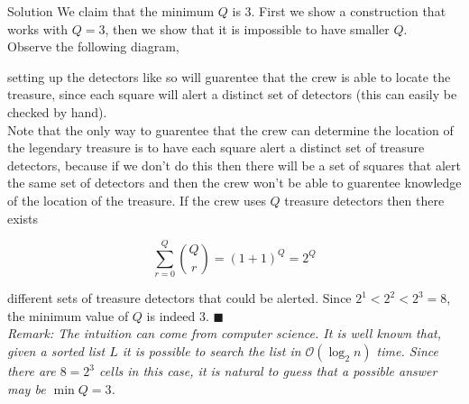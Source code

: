 \documentclass{article}
\begin{document}
\begin{solution}{Solution}
We claim that the minimum $Q$ is 3. First we show a construction that
works with $Q=3$, then we show that it is impossible to have smaller $Q$.\\

Observe the following diagram, \vspace{0.1cm}

\begin{center}
\end{center}

setting up the detectors like so will guarentee that the crew is able
to locate the treasure, since each square will alert a distinct set of
detectors (this can easily be checked by hand). \\

Note that the only way to guarentee that the crew can determine
the location of the legendary treasure is to have each square alert a
distinct set of treasure detectors, because if we don't do this then there
will be a set of squares that alert the same set of detectors and then the
crew won't be able to guarentee knowledge of the location of the treasure.
If the crew uses $Q$ treasure detectors then there exists

$$
\sum_{r=0}^Q \binom{Q}{r} = (1 + 1)^Q = 2^Q
$$

different sets of treasure detectors that could be alerted. Since
$2^1 < 2^2 < 2^3 = 8$, the minimum value of $Q$ is indeed 3. $\blacksquare$
\\

\textit{Remark: The intuition can come from computer science. It is well
known that, given a sorted list $L$ it is possible to
search the list in $\mathcal{O}(\log_2 n)$ time. Since there are
$8 = 2^3$ cells in this case, it is natural to guess that a possible
answer may be $\min Q = 3$.}
\end{solution}
\end{document}

